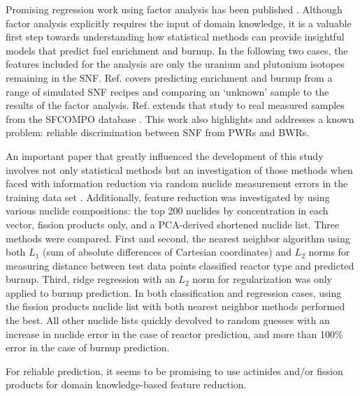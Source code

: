 Promising regression work using factor analysis has been published
\cite{nicolaou_2006, nicolaou_2014}.  Although factor analysis explicitly
requires the input of domain knowledge, it is a valuable first step towards
understanding how statistical methods can provide insightful models that
predict fuel enrichment and burnup. In the following two cases, the features
included for the analysis are only the uranium and plutonium isotopes remaining
in the \gls{SNF}.  Ref. \cite{nicolaou_2006} covers predicting enrichment and
burnup from a range of simulated \gls{SNF} recipes and comparing an `unknown'
sample to the results of the factor analysis. Ref.  \cite{nicolaou_2014}
extends that study to real measured samples from the \gls{SFCOMPO} database
\cite{sfcompo}. This work also highlights and addresses a known problem:
reliable discrimination between \gls{SNF} from \glspl{PWR} and \glspl{BWR}. 

An important paper that greatly influenced the development of this study
involves not only statistical methods but an investigation of those methods
when faced with information reduction via random nuclide measurement errors in
the training data set \cite{dayman_feasibility_2013}.  Additionally, feature
reduction was investigated by using various nuclide compositions: the top 200
nuclides by concentration in each vector, fission products only, and a
\gls{PCA}-derived shortened nuclide list.  Three methods were compared. First
and second, the nearest neighbor algorithm using both $L_1$ (sum of absolute
differences of Cartesian coordinates) and $L_2$ norms for measuring distance
between test data points classified reactor type and predicted burnup.  Third,
ridge regression with an $L_2$ norm for regularization was only applied to
burnup prediction. In both classification and regression cases, using the
fission products nuclide list with both nearest neighbor methods performed the
best. All other nuclide lists quickly devolved to random guesses with an
increase in nuclide error in the case of reactor prediction, and more than
100\% error in the case of burnup prediction.

For reliable prediction, it seems to be promising to use actinides
\cite{nicolaou_2006, nicolaou_2014} and/or fission products
\cite{dayman_feasibility_2013} for domain knowledge-based feature reduction.
